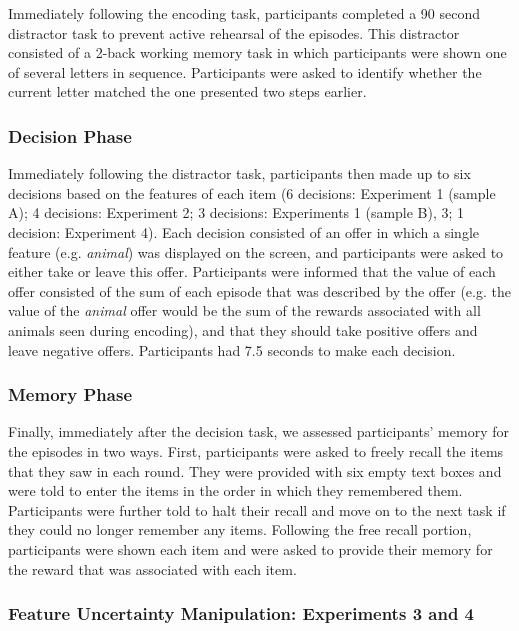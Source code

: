 \documentclass[10pt,letterpaper]{article}
\begin{document}
Immediately following the encoding task, participants completed a 90 second distractor task to prevent active rehearsal of the episodes. This distractor consisted of a 2-back working memory task in which participants were shown one of several letters in sequence. Participants were asked to identify whether the current letter matched the one presented two steps earlier.

\subsubsection{Decision Phase}

Immediately following the distractor task, participants then made up to six decisions based on the features of each item (6 decisions: Experiment 1 (sample A); 4 decisions: Experiment 2; 3 decisions: Experiments 1 (sample B), 3; 1 decision: Experiment 4). Each decision consisted of an offer in which a single feature (e.g. \textit{animal}) was displayed on the screen, and participants were asked to either take or leave this offer. Participants were informed that the value of each offer consisted of the sum of each episode that was described by the offer (e.g. the value of the \textit{animal} offer would be the sum of the rewards associated with all animals seen during encoding), and that they should take positive offers and leave negative offers. Participants had 7.5 seconds to make each decision.

\subsubsection{Memory Phase}

Finally, immediately after the decision task, we assessed participants' memory for the episodes in two ways. First, participants were asked to freely recall the items that they saw in each round. They were provided with six empty text boxes and were told to enter the items in the order in which they remembered them. Participants were further told to halt their recall and move on to the next task if they could no longer remember any items. Following the free recall portion, participants were shown each item and were asked to provide their memory for the reward that was associated with each item.

\subsubsection{Feature Uncertainty Manipulation: Experiments 3 and 4}
\end{document}
